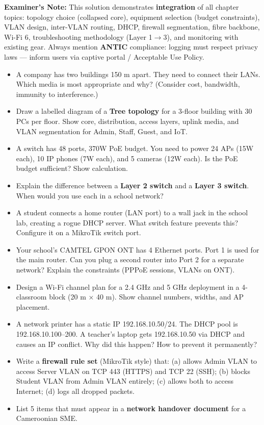 \documentclass[11pt]{article}
\begin{document}
\begin{exoresolu}
\textbf{Examiner's Note:} This solution demonstrates \textbf{integration} of all chapter topics: topology choice (collapsed core), equipment selection (budget constraints), VLAN design, inter-VLAN routing, DHCP, firewall segmentation, fibre backbone, Wi-Fi 6, troubleshooting methodology (Layer 1$\rightarrow$3), and monitoring with existing gear. Always mention \textbf{ANTIC} compliance: logging must respect privacy laws — inform users via captive portal / Acceptable Use Policy.
\end{exoresolu}

\begin{exercice}
\begin{itemize}
\item A company has two buildings 150 m apart. They need to connect their LANs. Which media is most appropriate and why? (Consider cost, bandwidth, immunity to interference.)
\item Draw a labelled diagram of a \textbf{Tree topology} for a 3-floor building with 30 PCs per floor. Show core, distribution, access layers, uplink media, and VLAN segmentation for Admin, Staff, Guest, and IoT.
\item A switch has 48 ports, 370W PoE budget. You need to power 24 APs (15W each), 10 IP phones (7W each), and 5 cameras (12W each). Is the PoE budget sufficient? Show calculation.
\item Explain the difference between a \textbf{Layer 2 switch} and a \textbf{Layer 3 switch}. When would you use each in a school network?
\item A student connects a home router (LAN port) to a wall jack in the school lab, creating a rogue DHCP server. What switch feature prevents this? Configure it on a MikroTik switch port.
\item Your school's CAMTEL GPON ONT has 4 Ethernet ports. Port 1 is used for the main router. Can you plug a second router into Port 2 for a separate network? Explain the constraints (PPPoE sessions, VLANs on ONT).
\item Design a Wi-Fi channel plan for a 2.4 GHz and 5 GHz deployment in a 4-classroom block (20 m × 40 m). Show channel numbers, widths, and AP placement.
\item A network printer has a static IP 192.168.10.50/24. The DHCP pool is 192.168.10.100–200. A teacher's laptop gets 192.168.10.50 via DHCP and causes an IP conflict. Why did this happen? How to prevent it permanently?
\item Write a \textbf{firewall rule set} (MikroTik style) that: (a) allows Admin VLAN to access Server VLAN on TCP 443 (HTTPS) and TCP 22 (SSH); (b) blocks Student VLAN from Admin VLAN entirely; (c) allows both to access Internet; (d) logs all dropped packets.
\item List 5 items that must appear in a \textbf{network handover document} for a Cameroonian SME.
\end{itemize}
\end{exercice}
\end{document}
